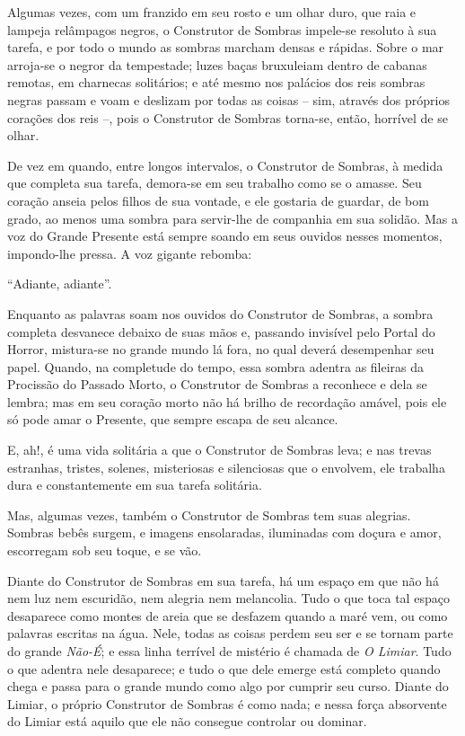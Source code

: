 Algumas vezes, com um franzido em seu rosto e um olhar duro, que raia e
lampeja relâmpagos negros, o Construtor de Sombras impele-se resoluto à
sua tarefa, e por todo o mundo as sombras marcham densas e rápidas.
Sobre o mar arroja-se o negror da tempestade; luzes baças bruxuleiam
dentro de cabanas remotas, em charnecas solitários; e até mesmo nos
palácios dos reis sombras negras passam e voam e deslizam por todas as
coisas -- sim, através dos próprios corações dos reis --, pois o
Construtor de Sombras torna-se, então, horrível de se olhar.

De vez em quando, entre longos intervalos, o Construtor de Sombras, à
medida que completa sua tarefa, demora-se em seu trabalho como se o
amasse. Seu coração anseia pelos filhos de sua vontade, e ele gostaria
de guardar, de bom grado, ao menos uma sombra para servir-lhe de
companhia em sua solidão. Mas a voz do Grande Presente está sempre
soando em seus ouvidos nesses momentos, impondo-lhe pressa. A voz
gigante rebomba:

``Adiante, adiante''.

Enquanto as palavras soam nos ouvidos do Construtor de Sombras, a sombra
completa desvanece debaixo de suas mãos e, passando invisível pelo
Portal do Horror, mistura-se no grande mundo lá fora, no qual deverá
desempenhar seu papel. Quando, na completude do tempo, essa sombra
adentra as fileiras da Procissão do Passado Morto, o Construtor de
Sombras a reconhece e dela se lembra; mas em seu coração morto não há
brilho de recordação amável, pois ele só pode amar o Presente, que
sempre escapa de seu alcance.

E, ah!, é uma vida solitária a que o Construtor de Sombras leva; e nas
trevas estranhas, tristes, solenes, misteriosas e silenciosas que o
envolvem, ele trabalha dura e constantemente em sua tarefa solitária.

Mas, algumas vezes, também o Construtor de Sombras tem suas alegrias.
Sombras bebês surgem, e imagens ensolaradas, iluminadas com doçura e
amor, escorregam sob seu toque, e se vão.

Diante do Construtor de Sombras em sua tarefa, há um espaço em que não
há nem luz nem escuridão, nem alegria nem melancolia. Tudo o que toca
tal espaço desaparece como montes de areia que se desfazem quando a maré
vem, ou como palavras escritas na água. Nele, todas as coisas perdem seu
ser e se tornam parte do grande \emph{Não-É}; e essa linha terrível de
mistério é chamada de \emph{O Limiar}. Tudo o que adentra nele
desaparece; e tudo o que dele emerge está completo quando chega e passa
para o grande mundo como algo por cumprir seu curso. Diante do Limiar, o
próprio Construtor de Sombras é como nada; e nessa força absorvente do
Limiar está aquilo que ele não consegue controlar ou dominar.

